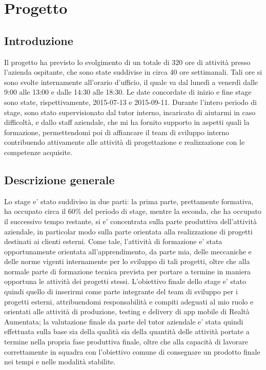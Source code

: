 \section{Progetto}
\subsection{Introduzione}
Il progetto ha previsto lo svolgimento di un totale di 320 ore di attività presso l’azienda ospitante, che sono state suddivise in circa 40 ore settimanali. Tali ore si sono svolte internamente all’orario d’ufficio, il quale va dal lunedì a venerdì dalle 9:00 alle 13:00 e dalle 14:30 alle 18:30.
Le date concordate di inizio e fine stage sono state, rispettivamente, 2015-07-13 e 2015-09-11. Durante l’intero periodo di stage, sono stato supervisionato dal tutor interno, incaricato di aiutarmi in caso difficoltà, e dallo staff aziendale, che mi ha fornito supporto in aspetti quali la formazione, permettendomi poi di affiancare il team di sviluppo interno contribuendo attivamente alle attività di progettazione e realizzazione con le competenze acquisite.

\subsection{Descrizione generale}
Lo stage e' stato suddiviso in due parti: la prima parte, prettamente formativa, ha occupato circa il 60\% del periodo di stage, mentre la seconda, che ha occupato il successivo tempo restante, si e' concentrata sulla parte produttiva dell’attività aziendale, in particolar modo sulla parte orientata alla realizzazione di progetti destinati ai clienti esterni. Come tale, l’attività di formazione e' stata opportunamente orientata all’apprendimento, da parte mia, delle meccaniche e delle norme vigenti internamente per lo sviluppo di tali progetti, oltre che alla normale parte di formazione tecnica prevista per portare a termine in maniera opportuna le attività dei progetti stessi.
L’obiettivo finale dello stage e' stato quindi quello di inserirmi come parte integrante del team di sviluppo per i progetti esterni, attribuendomi responsabilità e compiti adeguati al mio ruolo e orientati alle attività di produzione, testing e delivery di app mobile di Realtà Aumentata; la valutazione finale da parte del tutor aziendale e' stata quindi effettuata sulla base sia della qualità sia della quantità delle attività portate a termine nella propria fase produttiva finale, oltre che alla capacità di lavorare correttamente in squadra con l’obiettivo comune di consegnare un prodotto finale nei tempi e nelle modalità stabilite.

